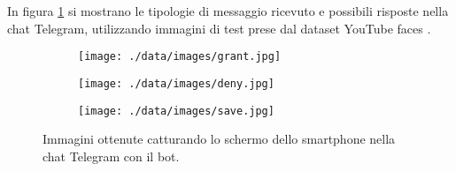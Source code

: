 In figura \ref{grant} si mostrano le tipologie di messaggio ricevuto e possibili risposte nella chat Telegram, utilizzando immagini di test prese dal dataset YouTube faces \cite{wolf2011face}.


\begin{figure}
	\centering
	\begin{subfigure}{0.45 \textwidth}
		\texttt{[image: ./data/images/grant.jpg]}
	\end{subfigure}
	\begin{subfigure}{0.45 \textwidth}
		\texttt{[image: ./data/images/deny.jpg]}
	\end{subfigure}
	\begin{subfigure}{0.45 \textwidth}
		\texttt{[image: ./data/images/save.jpg]}
	\end{subfigure}
	\caption{Immagini ottenute catturando lo schermo dello smartphone nella chat Telegram con il bot.}
	\label{grant}
\end{figure}




















